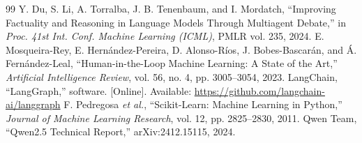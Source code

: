 \documentclass[9pt,a4paper,twocolumn]{extarticle}
\begin{document}
\begin{thebibliography}{99}
 Y. Du, S. Li, A. Torralba, J. B. Tenenbaum, and I. Mordatch, ``Improving Factuality and Reasoning in Language Models Through Multiagent Debate,'' in \textit{Proc. 41st Int. Conf. Machine Learning (ICML)}, PMLR vol. 235, 2024.
 E. Mosqueira-Rey, E. Hern\'{a}ndez-Pereira, D. Alonso-R\'{i}os, J. Bobes-Bascar\'{a}n, and \'{A}. Fern\'{a}ndez-Leal, ``Human-in-the-Loop Machine Learning: A State of the Art,'' \textit{Artificial Intelligence Review}, vol. 56, no. 4, pp. 3005--3054, 2023.
 LangChain, ``LangGraph,'' software. [Online]. Available: \url{https://github.com/langchain-ai/langgraph}
 F. Pedregosa \textit{et al.}, ``Scikit-Learn: Machine Learning in Python,'' \textit{Journal of Machine Learning Research}, vol. 12, pp. 2825--2830, 2011.
 Qwen Team, ``Qwen2.5 Technical Report,'' arXiv:2412.15115, 2024.
\end{thebibliography}
\end{document}

